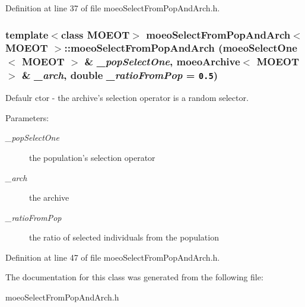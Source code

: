 Definition at line 37 of file moeo\-Select\-From\-Pop\-And\-Arch.h.
\subsubsection{\setlength{\rightskip}{0pt plus 5cm}template$<$class MOEOT$>$ {\bf moeo\-Select\-From\-Pop\-And\-Arch}$<$ MOEOT $>$::{\bf moeo\-Select\-From\-Pop\-And\-Arch} ({\bf moeo\-Select\-One}$<$ MOEOT $>$ \& {\em \_\-pop\-Select\-One}, {\bf moeo\-Archive}$<$ MOEOT $>$ \& {\em \_\-arch}, double {\em \_\-ratio\-From\-Pop} = {\tt 0.5})\hspace{0.3cm}{\tt  [inline]}}\label{classmoeoSelectFromPopAndArch_1c225b5f7b5a5ce6e87b46a7ea4a4cd0}


Defaulr ctor - the archive's selection operator is a random selector. 

\begin{Desc}
\item[Parameters:]
\begin{description}
\item[{\em \_\-pop\-Select\-One}]the population's selection operator \item[{\em \_\-arch}]the archive \item[{\em \_\-ratio\-From\-Pop}]the ratio of selected individuals from the population \end{description}
\end{Desc}


Definition at line 47 of file moeo\-Select\-From\-Pop\-And\-Arch.h.

The documentation for this class was generated from the following file:\begin{CompactItemize}
\item 
moeo\-Select\-From\-Pop\-And\-Arch.h\end{CompactItemize}
